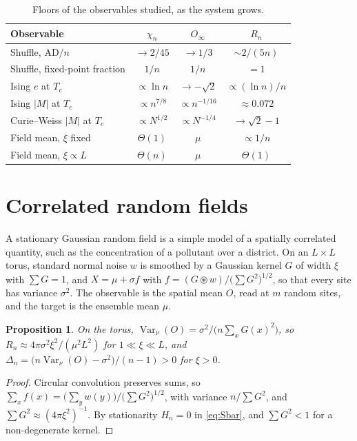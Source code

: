 \documentclass[ba]{imsart}
\theoremstyle{plain}
\newtheorem{proposition}[theorem]{Proposition}
\theoremstyle{definition}
\newcommand{\Var}{\operatorname{Var}}
\newcommand{\AD}{\mathrm{AD}}
\begin{document}
\begin{table}[t]
\centering
\caption{Floors of the observables studied, as the system grows.}
\label{tab:summary}
\small
\begin{tabular}{lccc}
\toprule
Observable & $\chi_n$ & $O_\infty$ & $R_n$\\
\midrule
Shuffle, $\AD/n$ & $\to2/45$ & $\to1/3$ & $\sim2/(5n)$\\
Shuffle, fixed-point fraction & $1/n$ & $1/n$ & $=1$\\
Ising $e$ at $T_c$ & $\propto\ln n$ & $\to-\sqrt2$ & $\propto(\ln n)/n$\\
Ising $|M|$ at $T_c$ & $\propto n^{7/8}$ & $\propto n^{-1/16}$ & $\approx0.072$\\
Curie--Weiss $|M|$ at $T_c$ & $\propto N^{1/2}$ & $\propto N^{-1/4}$ & $\to\sqrt2-1$\\
Field mean, $\xi$ fixed & $\Theta(1)$ & $\mu$ & $\propto1/n$\\
Field mean, $\xi\propto L$ & $\Theta(n)$ & $\mu$ & $\Theta(1)$\\
\bottomrule
\end{tabular}
\end{table}

\section{Correlated random fields}\label{sec:fields}

A stationary Gaussian random field is a simple model of a spatially correlated quantity, such as the concentration of a pollutant over a district. On an $L\times L$ torus, standard normal noise $w$ is smoothed by a Gaussian kernel $G$ of width $\xi$ with $\sum G=1$, and $X=\mu+\sigma f$ with $f=(G\circledast w)/\bigl(\sum G^2\bigr)^{1/2}$, so that every site has variance $\sigma^2$. The observable is the spatial mean $O$, read at $m$ random sites, and the target is the ensemble mean $\mu$.

\begin{proposition}\label{prop:field}
On the torus, $\Var_\nu(O)=\sigma^2/\bigl(n\sum_xG(x)^2\bigr)$, so $R_n\approx4\pi\sigma^2\xi^2/(\mu^2L^2)$ for $1\ll\xi\ll L$, and $\Delta_n=\bigl(n\Var_\nu(O)-\sigma^2\bigr)/(n-1)>0$ for $\xi>0$.
\end{proposition}

\begin{proof}
Circular convolution preserves sums, so $\sum_xf(x)=\bigl(\sum_yw(y)\bigr)/\bigl(\sum G^2\bigr)^{1/2}$, with variance $n/\sum G^2$, and $\sum G^2\approx(4\pi\xi^2)^{-1}$. By stationarity $H_n=0$ in \eqref{eq:Sbar}, and $\sum G^2<1$ for a non-degenerate kernel.
\end{proof}
\end{document}

